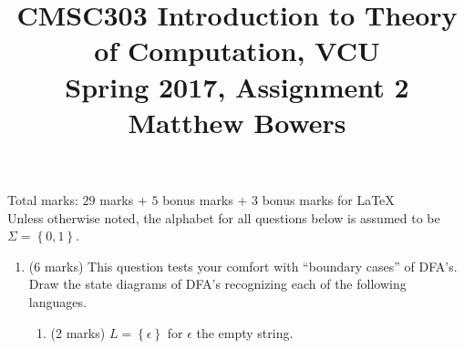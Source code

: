 \documentclass{article}
\newcommand{\set}[1]{{\left\{#1\right\}}}    %
\begin{document}
\title{CMSC303 Introduction to Theory of Computation, VCU\\Spring 2017, Assignment 2\\Matthew Bowers}
\date{}
\maketitle

Total marks: $29$ marks $+$ $5$ bonus marks $+$ $3$ bonus marks for LaTeX\\

Unless otherwise noted, the alphabet for all questions below is assumed to be $\Sigma=\set{0,1}$.

\begin{enumerate}
    \item (6 marks) This question tests your comfort with ``boundary cases'' of DFA's. Draw the state diagrams of DFA's recognizing each of the following languages.
    \begin{enumerate}
        \item (2 marks) $L=\set{\epsilon}$ for $\epsilon$ the empty string.


\end{enumerate}
\end{enumerate}
\end{document}
